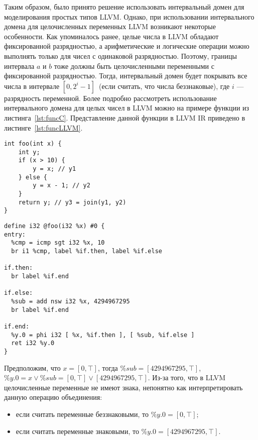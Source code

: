 Таким образом, было принято решение использовать интервальный домен для 
моделирования простых типов LLVM. Однако, при использовании интервального 
домена для целочисленных переменных LLVM возникают некоторые особенности. Как 
упоминалось ранее, целые числа в LLVM обладают фиксированной разрядностью, а 
арифметические и логические операции можно выполнять только для чисел с 
одинаковой разрядностью. Поэтому, границы интервала $a$ и $b$ тоже должны быть 
целочисленными переменными с фиксированной разрядностью. Тогда, интервальный 
домен будет покрывать все числа в интервале $[0, 2^i - 1]$~(если считать, что 
числа беззнаковые), где $i$ --- разрядность переменной. Более подробно 
рассмотреть использование интервального домена для целых чисел в LLVM можно на 
примере функции из листинга~\ref{lst:funcC}. Представление данной функции в 
LLVM IR приведено в листинге~\ref{lst:funcLLVM}.

\begin{lstlisting}[style=c, caption={Пример функции на языке С}, 
label=lst:funcC]
int foo(int x) {
    int y;
    if (x > 10) {
        y = x; // y1
    } else {
        y = x - 1; // y2
    }
    return y; // y3 = join(y1, y2)
}
\end{lstlisting}

\begin{lstlisting}[style=llvm, caption={Представление функции из 
    листинга~\ref{lst:funcC} в LLVM IR}, label=lst:funcLLVM]
define i32 @foo(i32 %x) #0 {
entry:
  %cmp = icmp sgt i32 %x, 10
  br i1 %cmp, label %if.then, label %if.else

if.then:
  br label %if.end

if.else:
  %sub = add nsw i32 %x, 4294967295
  br label %if.end

if.end:
  %y.0 = phi i32 [ %x, %if.then ], [ %sub, %if.else ]
  ret i32 %y.0
}
\end{lstlisting}

Предположим, что $x = [0, \top]$, тогда $\%sub = [4294967295, \top]$, $\%y.0 = 
x \vee \%sub = [0, \top] \vee [4294967295, \top]$. Из-за того, что в LLVM 
целочисленные переменные не имеют знака, непонятно как интерпретировать данную
операцию объединения:
\begin{itemize}
\item если считать переменные беззнаковыми, то $\%y.0 = [0, \top]$;
\item если считать переменные знаковыми, то $\%y.0 = [4294967295, \top]$.
\end{itemize}

